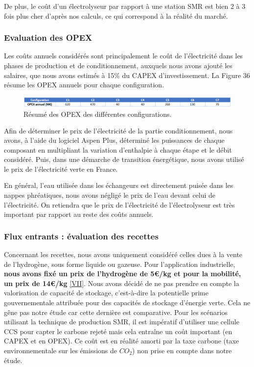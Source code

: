 \documentclass[11pt,french,a4paper]{article}
\begin{document}
De plus, le coût d’un électrolyseur par rapport à une station SMR est bien 2 à 3 fois plus cher d’après nos calculs, ce qui correspond à la réalité du marché.


\subsubsection{Evaluation des OPEX}

Les coûts annuels considérés sont principalement le coût de l’électricité dans les phases de production et de conditionnement, auxquels nous avons ajouté les salaires, que nous avons estimés à 15\% du CAPEX d’investissement. La Figure 36 résume les OPEX annuels pour chaque configuration.


\begin{figure}[h!]
\centering
\includegraphics[width=0.9\linewidth]{image/chap5/Tableau 3 chap 5.png}
\caption{ Résumé des OPEX des différentes configurations. }
\end{figure}

Afin de déterminer le prix de l’électricité de la partie conditionnement, nous avons, à l’aide du logiciel Aspen Plus, déterminé les puissances de chaque composant en multipliant la variation d’enthalpie à chaque étape et le débit considéré. Puis, dans une démarche de transition énergétique, nous avons utilisé le prix de l’électricité verte en France.

En général, l’eau utilisée dans les échangeurs est directement puisée dans les nappes phréatiques, nous avons négligé le prix de l’eau devant celui de l’électricité. On retiendra que le prix de l’électricité de l’électrolyseur est très important par rapport au reste des coûts annuels.  

\subsubsection{Flux entrants : évaluation des recettes}
Concernant les recettes, nous avons uniquement considéré celles dues à la vente de l’hydrogène, sous forme liquide ou gazeuse. Pour l’application industrielle, \textbf{nous avons fixé un prix de l'hydrogène de 5€/kg et pour la mobilité, un prix de 14€/kg} \hyperref[sec:presRef]{[VII]}.
Nous avons décidé de ne pas prendre en compte la valorisation de capacité de stockage, c’est-à-dire la potentielle prime gouvernementale attribuée pour des capacités de stockage d’énergie verte. Cela ne gêne pas notre étude car cette dernière est comparative.
Pour les scénarios utilisant la technique de production SMR, il est impératif d’utiliser une cellule CCS pour capter le carbone rejeté mais cela entraîne un coût important (en CAPEX et en OPEX). Ce coût est en réalité amorti par la taxe carbone (taxe environnementale sur les émissions de $CO_2$) non prise en compte dans notre étude.
\end{document}
